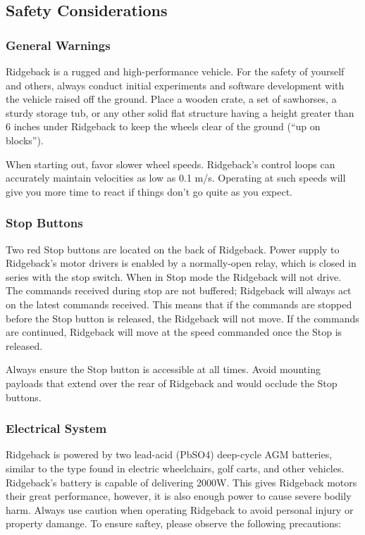\documentclass[]{clearpath-latex/clearpath-manual}
\begin{document}
\subsection{Safety Considerations}

\subsubsection{General Warnings}

Ridgeback is a rugged and high-performance vehicle. For the safety of yourself and others, always conduct initial experiments and software development with the vehicle raised off the ground. Place a wooden crate, a set of sawhorses, a sturdy storage tub, or any other solid flat structure having a height greater than 6 inches under Ridgeback to keep the wheels clear of the ground (“up on blocks”).

When starting out, favor slower wheel speeds. Ridgeback's control loops can accurately maintain velocities as low as 0.1 m/s. Operating at such speeds will give you more time to react if things don’t go quite as you expect.

\subsubsection{Stop Buttons}

Two red Stop buttons are located on the back of Ridgeback. Power supply to Ridgeback's motor drivers is enabled by a normally-open relay, which is closed in series with the stop switch. When in Stop mode the Ridgeback will not drive. The commands received during stop are not buffered; Ridgeback will always act on the latest commands received. This means that if the commands are stopped before the Stop button is released, the Ridgeback will not move. If the commands are continued, Ridgeback will move at the speed commanded once the Stop is released.

Always ensure the Stop button is accessible at all times. Avoid mounting payloads that extend over the rear of Ridgeback and would occlude the Stop buttons.

\subsubsection{Electrical System}

Ridgeback is powered by two lead-acid (PbSO4) deep-cycle AGM batteries, similar to the type found in electric wheelchairs, golf carts, and other vehicles. Ridgeback's battery is capable of delivering 2000W. This gives Ridgeback motors their great performance, however, it is also enough power to cause severe bodily harm. Always use caution when operating Ridgeback to avoid personal injury or property damange.  To ensure saftey, please observe the following precautions:
\end{document}
